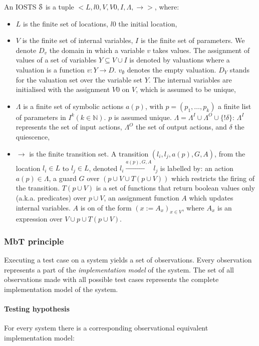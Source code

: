 \begin{definition}[IOSTS]
An IOSTS $\EuScript{S}$ is a tuple $<
L,l0,V,V0,I,\Lambda,\rightarrow>$, where:

\begin{itemize}
\item $L$ is the finite set of locations, $l0$ the initial
location,

\item $V$ is the finite set of internal variables, $I$ is the
finite set of parameters. We denote $D_v$ the domain in which a
variable $v$ takes values. The assignment of values of a set of
variables $Y \subseteq V \cup I$ is denoted by valuations where a
valuation is a function $v: Y \rightarrow D$. $v_\emptyset$
denotes the empty valuation. $D_Y$ stands for the valuation set
over the variable set $Y$. The internal variables are initialised
with the assignment $V0$ on $V$, which is assumed to be unique,

\item $\Lambda$ is a finite set of symbolic actions $a(p)$, with
$p = (p_1,\dots,p_k)$ a finite list of parameters in $I^k(k \in
\mathbb{N})$. $p$ is assumed unique. $\Lambda= \Lambda^I  \cup
\Lambda^O \cup \{!\delta \}$: $\Lambda^I$ represents the set of
input actions, $\Lambda^O$ the set of output actions, and
$\delta$ the quiescence,

\item $\rightarrow$ is the finite transition set. A transition
$(l_i,l_j,a(p),G,A)$, from the location $l_i \in L$ to $l_j \in
L$, denoted $l_i \xrightarrow{a(p),G,A} l_j$ is labelled by: an
action $a(p) \in \Lambda$, a guard  $G$ over $(p \cup V \cup T(p
\cup V))$ which restricts the firing of the transition. $T(p \cup
V)$ is a set of functions that return boolean values only (a.k.a.
predicates) over $p \cup V$, an assignment function $A$ which
updates internal variables. $A$ is on of the form $(x:=A_x)_{x\in
V}$, where $A_x$ is an expression over $V \cup p \cup T(p \cup
V)$.
\end{itemize}
\end{definition}

\subsubsection{MbT principle}

Executing a test case on a system yields a set of observations.
Every observation represents a part of the \textit{implementation
model} of the system. The set of all observations made with all
possible test cases represents the complete implementation model
of the system.

\paragraph{Testing hypothesis} For every system there is a
corresponding observational equivalent implementation model:

